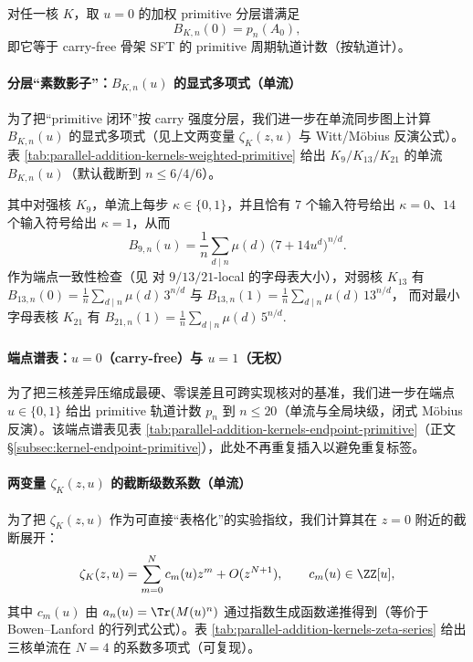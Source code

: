 \begin{corollary}\label{cor:Bn0-equals-primitive-skeleton}
对任一核 $K$，取 $u=0$ 的加权 primitive 分层谱满足
\[
B_{K,n}(0)=p_n(A_0),
\]
即它等于 carry-free 骨架 SFT 的 primitive 周期轨道计数（按轨道计）。
\end{corollary}




\paragraph{分层“素数影子”：\texorpdfstring{$B_{K,n}(u)$}{B\_{K,n}(u)} 的显式多项式（单流）}
为了把“primitive 闭环”按 carry 强度分层，我们进一步在单流同步图上计算 $B_{K,n}(u)$ 的显式多项式（见上文两变量 $\zeta_K(z,u)$ 与 Witt/Möbius 反演公式）。表 \ref{tab:parallel-addition-kernels-weighted-primitive} 给出 $K_9/K_{13}/K_{21}$ 的单流 $B_{K,n}(u)$（默认截断到 $n\le 6/4/6$）。
\par
其中对强核 $K_9$，单流上每步 $\kappa\in\{0,1\}$，并且恰有 $7$ 个输入符号给出 $\kappa=0$、$14$ 个输入符号给出 $\kappa=1$，从而
\[
B_{9,n}(u)=\frac{1}{n}\sum_{d\mid n}\mu(d)\,\bigl(7+14u^d\bigr)^{n/d}.
\]
作为端点一致性检查（见 \cite{FrougnyHellerPelantovaSvobodovaParallelAlgorithmsSlides} 对 $9/13/21$-local 的字母表大小），对弱核 $K_{13}$ 有
\(
B_{13,n}(0)=\frac{1}{n}\sum_{d\mid n}\mu(d)\,3^{n/d}
\)
与
\(
B_{13,n}(1)=\frac{1}{n}\sum_{d\mid n}\mu(d)\,13^{n/d}
\)，
而对最小字母表核 $K_{21}$ 有
\(
B_{21,n}(1)=\frac{1}{n}\sum_{d\mid n}\mu(d)\,5^{n/d}.
\)


\paragraph{端点谱表：\texorpdfstring{$u=0$}{u=0}（carry-free）与 \texorpdfstring{$u=1$}{u=1}（无权）}
为了把三核差异压缩成最硬、零误差且可跨实现核对的基准，我们进一步在端点 $u\in\{0,1\}$ 给出 primitive 轨道计数 $p_n$ 到 $n\le 20$（单流与全局块级，闭式 Möbius 反演）。该端点谱表见表 \ref{tab:parallel-addition-kernels-endpoint-primitive}（正文 \S\ref{subsec:kernel-endpoint-primitive}），此处不再重复插入以避免重复标签。

\paragraph{两变量 \texorpdfstring{$\zeta_K(z,u)$}{zeta(z,u)} 的截断级数系数（单流）}
为了把 $\zeta_K(z,u)$ 作为可直接“表格化”的实验指纹，我们计算其在 $z=0$ 附近的截断展开：
\[
\zeta_K(z,u)=\sum_{m=0}^{N}c_m(u)z^m+O(z^{N+1}),
\qquad c_m(u)\in\ZZ[u],
\]
其中 $c_m(u)$ 由 $a_n(u)=\Tr(M(u)^n)$ 通过指数生成函数递推得到（等价于 Bowen--Lanford 的行列式公式）。表 \ref{tab:parallel-addition-kernels-zeta-series} 给出三核单流在 $N=4$ 的系数多项式（可复现）。


